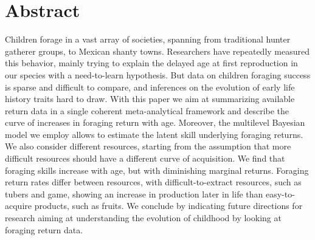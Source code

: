 \section*{Abstract}
Children forage in a vast array of societies, spanning from traditional hunter gatherer groups, to Mexican shanty towns. Researchers have repeatedly measured this behavior, mainly trying to explain the delayed age at first reproduction in our species with a need-to-learn hypothesis. But data on children foraging success is sparse and difficult to compare, and inferences on the evolution of early life history traits hard to draw. With this paper we aim at summarizing available return data in a single coherent meta-analytical framework and describe the curve of increases in foraging return with age. Moreover, the multilevel Bayesian model we employ allows to estimate the latent skill underlying foraging returns. We also consider different resources, starting from the assumption that more difficult resources should have a different curve of acquisition. We find that foraging skills increase with age, but with diminishing marginal returns. Foraging return rates differ between resources, with difficult-to-extract resources, such as tubers and game, showing an increase in production later in life than easy-to-acquire products, such as fruits. We conclude by indicating future directions for research aiming at understanding the evolution of childhood by looking at foraging return data.  






